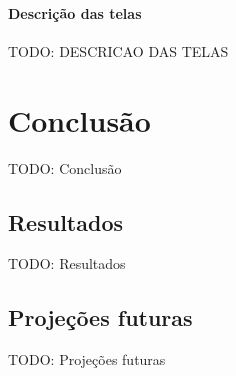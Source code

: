 \subsubsection{Descrição das telas}

TODO: DESCRICAO DAS TELAS


\chapter{Conclusão}

TODO: Conclusão

\section{Resultados}

TODO: Resultados

\section{Projeções futuras}

TODO: Projeções futuras